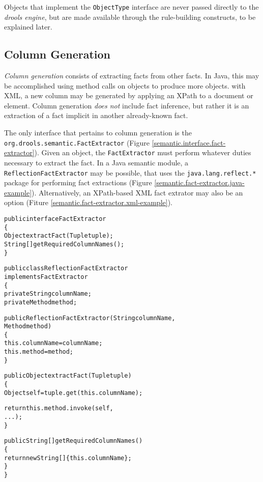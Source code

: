 \documentclass[10pt,twocolumn,letterpaper]{article}
\newenvironment{codelisting}%
	{\begin{minipage}{250pt}\small\begin{alltt}}%
	{\end{alltt}\end{minipage}}
\begin{document}
Objects that implement the \verb|ObjectType| interface are never
passed directly to the \emph{drools engine}, but are made available
through the rule-building constructs, to be explained later.

\subsection{Column Generation}

\emph{Column generation} consists of extracting facts from other
facts.  In Java, this may be accomplished using method calls on
objects to produce more objects.  with XML, a new column may be
generated by applying an XPath to a document or element.  Column
generation \emph{does not} include fact inference, but rather
it is an extraction of a fact implicit in another already-known
fact.

The only interface that pertains to column generation is the
\verb|org.drools.semantic.FactExtractor| (Figure
\ref{semantic.interface.fact-extractor}).
Given an object, the \verb|FactExtractor| must perform whatever 
duties necessary to extract the fact. In a Java semantic module, a 
\verb|ReflectionFactExtractor| may be possible, that uses the
\verb|java.lang.reflect.*| package for performing fact 
extractions (Figure \ref{semantic.fact-extractor.java-example}).
Alternatively, an XPath-based XML fact extrator may also
be an option (Fiture \ref{semantic.fact-extractor.xml-example}).

\begin{figure*}[p]
	\begin{codelisting}
	public interface FactExtractor
	\{
	     Object extractFact(Tuple tuple);
	     String[] getRequiredColumnNames();
	\}
	\end{codelisting}
	\caption{The \emph{FactExtractor} interface.}
	\label{semantic.interface.fact-extractor}
\end{figure*}

\begin{figure*}[p]
	\begin{codelisting}
	public class ReflectionFactExtractor 
	             implements FactExtractor
	\{
	     private String columnName;
	     private Method method;

	     public ReflectionFactExtractor(String columnName,
	                                    Method method)
	     \{
	          this.columnName = columnName;
	          this.method     = method;
	     \}

	     public Object extractFact(Tuple tuple)
	     \{
	          Object self = tuple.get( this.columnName );

	          return this.method.invoke( self,
	                                     ... );
	     \}

	     public String[] getRequiredColumnNames()
	     \{
	          return new String[] \{ this.columnName \};
	     \}
	\}
	\end{codelisting}
	\caption{Example \emph{FactExtractor} implementing Java method semantics.}
	\label{semantic.fact-extractor.java-example}
\end{figure*}
\end{document}

